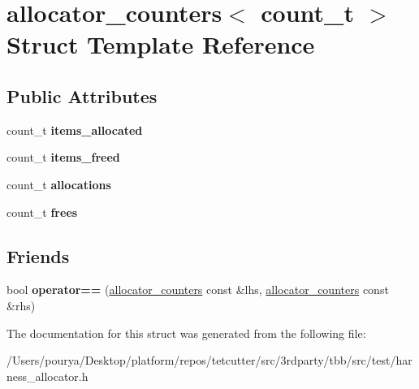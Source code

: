 \hypertarget{structallocator__counters}{}\section{allocator\+\_\+counters$<$ count\+\_\+t $>$ Struct Template Reference}
\label{structallocator__counters}
\subsection*{Public Attributes}
\begin{DoxyCompactItemize}
\item 
\hypertarget{structallocator__counters_ab5e233b89acbcdd170d3f8082c2f35a4}{}count\+\_\+t {\bfseries items\+\_\+allocated}\label{structallocator__counters_ab5e233b89acbcdd170d3f8082c2f35a4}

\item 
\hypertarget{structallocator__counters_a40e2f215dafab83e768ef963ec362f19}{}count\+\_\+t {\bfseries items\+\_\+freed}\label{structallocator__counters_a40e2f215dafab83e768ef963ec362f19}

\item 
\hypertarget{structallocator__counters_a84109ad61838320b22812abf7264d9d4}{}count\+\_\+t {\bfseries allocations}\label{structallocator__counters_a84109ad61838320b22812abf7264d9d4}

\item 
\hypertarget{structallocator__counters_a2c9aff066db78dacef6ef340f3f5194a}{}count\+\_\+t {\bfseries frees}\label{structallocator__counters_a2c9aff066db78dacef6ef340f3f5194a}

\end{DoxyCompactItemize}
\subsection*{Friends}
\begin{DoxyCompactItemize}
\item 
\hypertarget{structallocator__counters_aa2ff30698d2f7b37838ebb1eb5d5b79f}{}bool {\bfseries operator==} (\hyperlink{structallocator__counters}{allocator\+\_\+counters} const \&lhs, \hyperlink{structallocator__counters}{allocator\+\_\+counters} const \&rhs)\label{structallocator__counters_aa2ff30698d2f7b37838ebb1eb5d5b79f}

\end{DoxyCompactItemize}


The documentation for this struct was generated from the following file\+:\begin{DoxyCompactItemize}
\item 
/\+Users/pourya/\+Desktop/platform/repos/tetcutter/src/3rdparty/tbb/src/test/harness\+\_\+allocator.\+h\end{DoxyCompactItemize}
